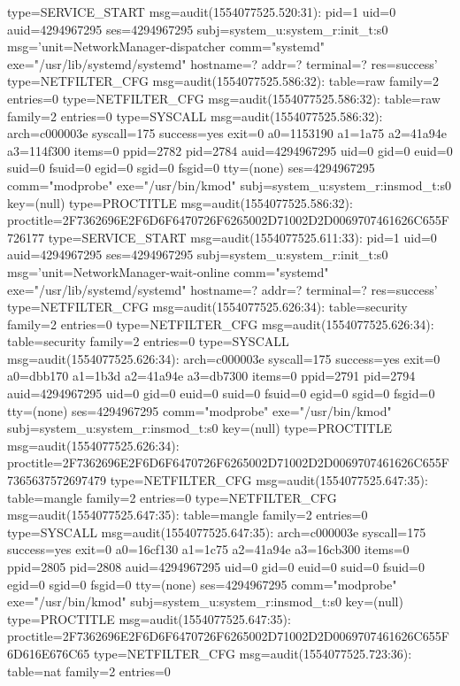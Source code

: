 \documentclass[]{report}
\newenvironment{Shaded}{}{}
\newcommand{\NormalTok}[1]{#1}
\begin{document}
\begin{Shaded}
\begin{Highlighting}[]
\NormalTok{type=SERVICE_START msg=audit(1554077525.520:31): pid=1 uid=0 auid=4294967295 ses=4294967295 subj=system_u:system_r:init_t:s0 msg='unit=NetworkManager-dispatcher comm="systemd" exe="/usr/lib/systemd/systemd" hostname=? addr=? terminal=? res=success'}
\NormalTok{type=NETFILTER_CFG msg=audit(1554077525.586:32): table=raw family=2 entries=0}
\NormalTok{type=NETFILTER_CFG msg=audit(1554077525.586:32): table=raw family=2 entries=0}
\NormalTok{type=SYSCALL msg=audit(1554077525.586:32): arch=c000003e syscall=175 success=yes exit=0 a0=1153190 a1=1a75 a2=41a94e a3=114f300 items=0 ppid=2782 pid=2784 auid=4294967295 uid=0 gid=0 euid=0 suid=0 fsuid=0 egid=0 sgid=0 fsgid=0 tty=(none) ses=4294967295 comm="modprobe" exe="/usr/bin/kmod" subj=system_u:system_r:insmod_t:s0 key=(null)}
\NormalTok{type=PROCTITLE msg=audit(1554077525.586:32): proctitle=2F7362696E2F6D6F6470726F6265002D71002D2D0069707461626C655F726177}
\NormalTok{type=SERVICE_START msg=audit(1554077525.611:33): pid=1 uid=0 auid=4294967295 ses=4294967295 subj=system_u:system_r:init_t:s0 msg='unit=NetworkManager-wait-online comm="systemd" exe="/usr/lib/systemd/systemd" hostname=? addr=? terminal=? res=success'}
\NormalTok{type=NETFILTER_CFG msg=audit(1554077525.626:34): table=security family=2 entries=0}
\NormalTok{type=NETFILTER_CFG msg=audit(1554077525.626:34): table=security family=2 entries=0}
\NormalTok{type=SYSCALL msg=audit(1554077525.626:34): arch=c000003e syscall=175 success=yes exit=0 a0=dbb170 a1=1b3d a2=41a94e a3=db7300 items=0 ppid=2791 pid=2794 auid=4294967295 uid=0 gid=0 euid=0 suid=0 fsuid=0 egid=0 sgid=0 fsgid=0 tty=(none) ses=4294967295 comm="modprobe" exe="/usr/bin/kmod" subj=system_u:system_r:insmod_t:s0 key=(null)}
\NormalTok{type=PROCTITLE msg=audit(1554077525.626:34): proctitle=2F7362696E2F6D6F6470726F6265002D71002D2D0069707461626C655F7365637572697479}
\NormalTok{type=NETFILTER_CFG msg=audit(1554077525.647:35): table=mangle family=2 entries=0}
\NormalTok{type=NETFILTER_CFG msg=audit(1554077525.647:35): table=mangle family=2 entries=0}
\NormalTok{type=SYSCALL msg=audit(1554077525.647:35): arch=c000003e syscall=175 success=yes exit=0 a0=16cf130 a1=1c75 a2=41a94e a3=16cb300 items=0 ppid=2805 pid=2808 auid=4294967295 uid=0 gid=0 euid=0 suid=0 fsuid=0 egid=0 sgid=0 fsgid=0 tty=(none) ses=4294967295 comm="modprobe" exe="/usr/bin/kmod" subj=system_u:system_r:insmod_t:s0 key=(null)}
\NormalTok{type=PROCTITLE msg=audit(1554077525.647:35): proctitle=2F7362696E2F6D6F6470726F6265002D71002D2D0069707461626C655F6D616E676C65}
\NormalTok{type=NETFILTER_CFG msg=audit(1554077525.723:36): table=nat family=2 entries=0}

\end{Highlighting}
\end{Shaded}
\end{document}
